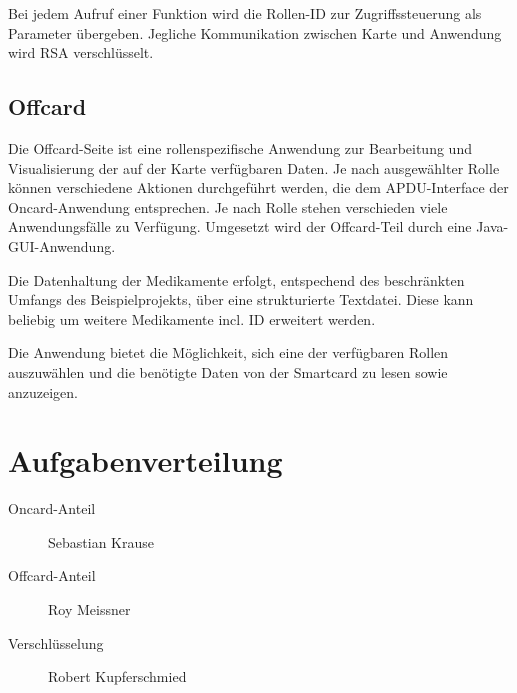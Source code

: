 \documentclass[parskip]{scrartcl}
\begin{document}
			Bei jedem Aufruf einer Funktion wird die Rollen-ID zur Zugriffssteuerung als Parameter übergeben. Jegliche Kommunikation zwischen Karte und Anwendung wird RSA verschlüsselt.
		
		\subsection{Offcard}
			Die Offcard-Seite ist eine rollenspezifische Anwendung zur Bearbeitung und Visualisierung der auf der Karte verfügbaren Daten. Je nach ausgewählter Rolle können verschiedene Aktionen durchgeführt werden, die dem APDU-Interface der Oncard-Anwendung entsprechen. Je nach Rolle stehen verschieden viele Anwendungsfälle zu Verfügung. Umgesetzt wird der Offcard-Teil durch eine Java-GUI-Anwendung. 
			
			Die Datenhaltung der Medikamente erfolgt, entspechend des beschränkten Umfangs des Beispielprojekts, über eine strukturierte Textdatei. Diese kann beliebig um weitere Medikamente incl. ID erweitert werden.
			
			Die Anwendung bietet die Möglichkeit, sich eine der verfügbaren Rollen auszuwählen und die benötigte Daten von der Smartcard zu lesen sowie anzuzeigen.
		
	\section{Aufgabenverteilung}
		\begin{description}
			\item[Oncard-Anteil] Sebastian Krause
			\item[Offcard-Anteil] Roy Meissner
			\item[Verschlüsselung] Robert Kupferschmied
		\end{description}
	
\end{document}
